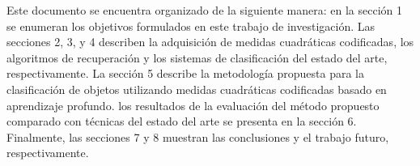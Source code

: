 Este documento se encuentra organizado de la siguiente manera: en la sección 1 se enumeran los objetivos formulados en este trabajo de investigación. Las secciones 2, 3, y 4 describen la adquisición de medidas cuadráticas codificadas, los algoritmos de recuperación y los sistemas de clasificación del estado del arte, respectivamente. La sección 5 describe la metodología propuesta para la clasificación de objetos utilizando medidas cuadráticas codificadas basado en aprendizaje profundo. los resultados de la evaluación del método propuesto comparado con técnicas del estado del arte se presenta en la sección 6. Finalmente, las secciones 7 y 8 muestran las conclusiones y el trabajo futuro, respectivamente. 


